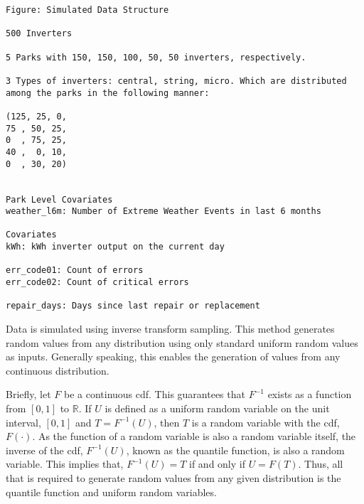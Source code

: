 \begin{lstlisting}
Figure: Simulated Data Structure

500 Inverters

5 Parks with 150, 150, 100, 50, 50 inverters, respectively.

3 Types of inverters: central, string, micro. Which are distributed among the parks in the following manner:

(125, 25, 0,
75 , 50, 25,
0  , 75, 25,
40 ,  0, 10,
0  , 30, 20)


Park Level Covariates
weather_l6m: Number of Extreme Weather Events in last 6 months

Covariates
kWh: kWh inverter output on the current day

err_code01: Count of errors
err_code02: Count of critical errors

repair_days: Days since last repair or replacement
\end{lstlisting}





Data is simulated using inverse transform sampling. This method generates random values from any distribution using only standard uniform random values as inputs. Generally speaking, this enables the generation of values from any continuous distribution. 

Briefly, let $F$ be a continuous cdf. This guarantees that $F^{-1}$ exists as a function from $[0,1]$ to $\mathbb{R}$. If $U$ is defined as a uniform random variable on the unit interval, $[0,1]$ and $T = F^{-1}(U)$, then $T$ is a random variable with the cdf, $F(\cdot)$. As the function of a random variable is also a random variable itself, the inverse of the cdf, $F^{-1}(U)$, known as the quantile function, is also a random variable\cite{Blitzstein2014}. This implies that, $F^{-1}(U) = T$ if and only if $U = F(T)$. Thus, all that is required to generate random values from any given distribution is the quantile function and uniform random variables. 

